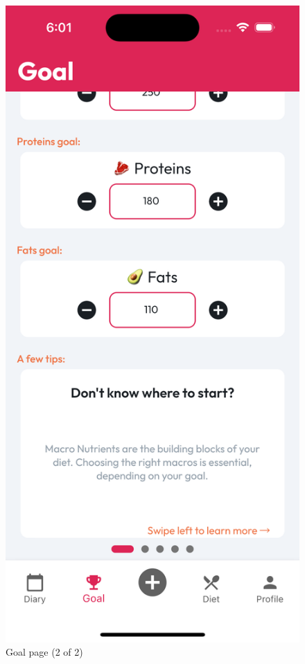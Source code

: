 \documentclass{Configuration_Files/PoliMi3i_thesis}
\begin{document}
\begin{figure}[!h]
  \includegraphics[scale=0.1]{Images/Screenshots/Mobile/Goal2Light.png}
  \caption{Goal page (2 of 2)}
\end{figure}

\clearpage
\end{document}
